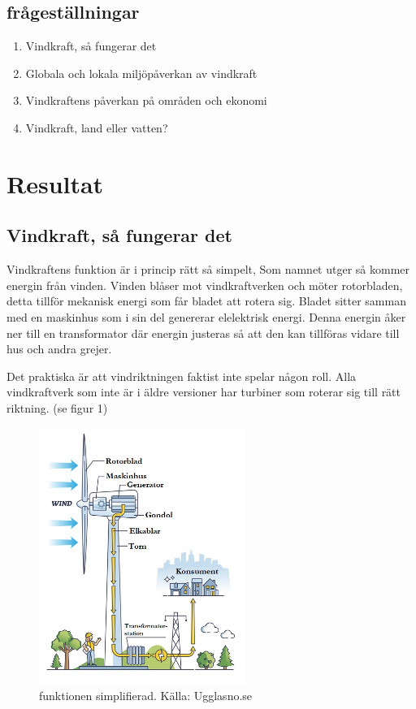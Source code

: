 \documentclass[11p]{article}
\begin{document}
    \subsection{frågeställningar}
    \begin{enumerate}
        \item Vindkraft, så fungerar det
        \item Globala och lokala miljöpåverkan av vindkraft
        \item Vindkraftens påverkan på områden och ekonomi
        \item Vindkraft, land eller vatten?
    \end{enumerate}

    \section{Resultat}

    \subsection{Vindkraft, så fungerar det}

  Vindkraftens funktion är i princip rätt så simpelt, Som namnet utger så kommer energin från vinden.
  Vinden blåser mot vindkraftverken och möter rotorbladen, detta tillför mekanisk energi som får
  bladet att rotera sig.
  Bladet sitter samman med en maskinhus som i sin del genererar elelektrisk
  energi.
  Denna energin åker ner till en transformator där energin justeras så att den kan tillföras
  vidare till hus och andra grejer.

  Det praktiska är att vindriktningen faktist inte spelar någon  roll.
   Alla vindkraftverk som inte är i äldre versioner har turbiner som roterar sig till rätt riktning. (se figur 1)

    \endsubsection

    \begin{figure}
        \includegraphics[width=0.6\textwidth]{../images/vindhur.jpg}
        \caption{funktionen simplifierad. Källa: Ugglasno.se}
    \end{figure}
\end{document}
